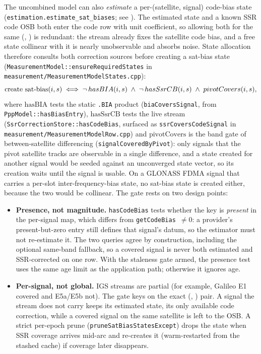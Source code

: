 \documentclass[main.tex]{subfiles}
\begin{document}
The uncombined model can also \emph{estimate} a per-(satellite, signal)
code-bias state (\texttt{estimation.estimate\_sat\_biases}; see
). The estimated state and a
known SSR code OSB both enter the code row with unit coefficient, so
allowing both for the same (\sat, \sigl) is redundant: the stream already
fixes the satellite code bias, and a free state collinear with it is
nearly unobservable and absorbs noise. State allocation therefore consults
both correction sources before creating a sat-bias state
(\texttt{MeasurementModel::ensureRequiredStates} in
\texttt{measurement/MeasurementModelStates.cpp}):
\begin{equation}
\text{create sat-bias}(i,s)
\;\Longleftrightarrow\;
\neg\,hasBIA(i,s)
\;\wedge\;
\neg\,hasSsrCB(i,s)
\;\wedge\;
pivotCovers(i,s),
\label{eq:ssr-satbias-gate}
\end{equation}
where $\mathrm{hasBIA}$ tests the static \texttt{.BIA} product
(\texttt{biaCoversSignal}, from \texttt{PppModel::hasBiasEntry}),
$\mathrm{hasSsrCB}$ tests the live stream
(\texttt{SsrCorrectionStore::hasCodeBias}, surfaced as
\texttt{ssrCoversCodeSignal} in \texttt{measurement/MeasurementModelRow.cpp})
and $\mathrm{pivotCovers}$ is the band gate of between-satellite
differencing (\texttt{signalCoveredByPivot}): only signals that the pivot
satellite tracks are observable in a single difference, and a state created
for another signal would be seeded against an unconverged state vector, so
its creation waits until the signal is usable. On a GLONASS FDMA signal that carries a
per-slot inter-frequency-bias state, no sat-bias state is created either,
because the two would be collinear. The gate rests on two design points:
\begin{itemize}[leftmargin=*]
  \item \textbf{Presence, not magnitude.} \texttt{hasCodeBias} tests
        whether the key is \emph{present} in the per-signal map, which
        differs from \texttt{getCodeBias}~$\neq 0$: a provider's
        present-but-zero entry still defines that signal's datum, so the
        estimator must not re-estimate it. The two queries agree by
        construction, including the optional same-band fallback, so a
        covered signal is never both estimated and SSR-corrected on one
        row. With the staleness gate armed, the presence test uses the
        same age limit as the application path; otherwise it ignores age.
  \item \textbf{Per-signal, not global.} IGS streams are partial (for
        example, Galileo E1 covered and E5a/E5b not). The gate keys on the
        exact (\sat, \sigl) pair. A signal the stream does not carry keeps
        its estimated state, its only available code correction, while a
        covered signal on the same satellite is left to the OSB. A strict
        per-epoch prune (\texttt{pruneSatBiasStatesExcept}) drops the state
        when SSR coverage arrives mid-arc and re-creates it (warm-restarted
        from the stashed cache) if coverage later disappears.
\end{itemize}
\end{document}
